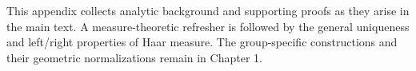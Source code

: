 This appendix collects analytic background and supporting proofs as they arise in the main text. A measure-theoretic refresher is followed by the general uniqueness and left/right properties of Haar measure. The group-specific constructions and their geometric normalizations remain in Chapter 1.
